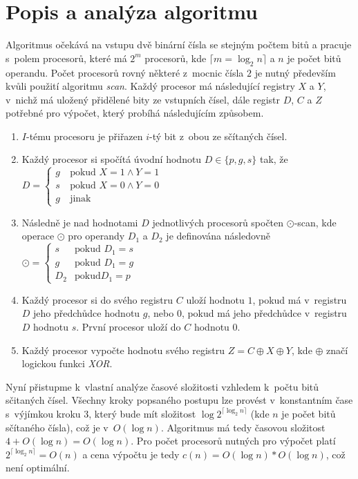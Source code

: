 \documentclass[a4paper, 12pt]{article}
\begin{document}
\section{Popis a analýza algoritmu}
\label{sec:analysis}
Algoritmus očekává na vstupu dvě binární čísla se stejným počtem bitů a pracuje s~polem
procesorů, které má $2^m$ procesorů, kde $\lceil m=\log_{2}{n} \rceil$ a $n$ je počet bitů operandu.
Počet procesorů rovný některé z~mocnic čísla $2$ je nutný především kvůli použití algoritmu \emph{scan}.
Každý procesor má následující registry $X$ a $Y$, v~nichž má uložený přidělené bity ze vstupních čísel,
dále registr $D$, $C$ a $Z$ potřebné pro výpočet, který probíhá následujícím způsobem.
\begin{enumerate}
    \item $I$-tému procesoru je přiřazen $i$-tý bit z~obou ze sčítaných čísel.
    \item Každý procesor si spočítá úvodní hodnotu $D\in \{p,g,s\}$ tak, že $D=
        \left\{
        \begin{array}{ll}
             g & \mbox{pokud } X=1 \wedge Y=1 \\
             s~& \mbox{pokud } X=0 \wedge Y=0 \\
             g & \mbox{jinak}
        \end{array}
        \right.
        $
    \item Následně je nad hodnotami $D$ jednotlivých procesorů spočten $\odot$-scan, kde
        operace $\odot$ pro operandy $D_1$ a $D_2$ je definována následovně $\odot=
        \left\{
        \begin{array}{ll}
             s~& \mbox{pokud } D_1=s \\
             g~& \mbox{pokud } D_1=g \\
             D_2 & \mbox{pokud} D_1=p
        \end{array}
        \right.
        $
    \item Každý procesor si do svého registru $C$ uloží hodnotu $1$, pokud má v~registru $D$ jeho
    předchůdce hodnotu $g$, nebo $0$, pokud má jeho předchůdce v~registru $D$ hodnotu $s$.
    První procesor uloží do $C$ hodnotu $0$.
    \item Každý procesor vypočte hodnotu svého registru $Z=C\oplus X \oplus Y$, kde $\oplus$
    značí logickou funkci \emph{XOR}.
\end{enumerate}
Nyní přistupme k~vlastní analýze časové složitosti vzhledem k~počtu bitů sčitaných čísel.
Všechny kroky popsaného postupu lze provést v~konstantním čase s~výjímkou kroku $3$, který
bude mít složitost $\log{2^{\lceil \log_{2}{n} \rceil}}$ (kde $n$ je počet bitů sčítaného čísla), což
je v~$O(\log{n})$.
Algoritmus má tedy časovou složitost $4+O(\log{n})=O(\log{n})$.
Pro počet procesorů nutných pro výpočet platí $2^{\lceil \log_{2}{n} \rceil}=O(n)$
a cena výpočtu je tedy $c(n)=O(\log{n})*O(\log{n})$, což není optimální.
\end{document}
